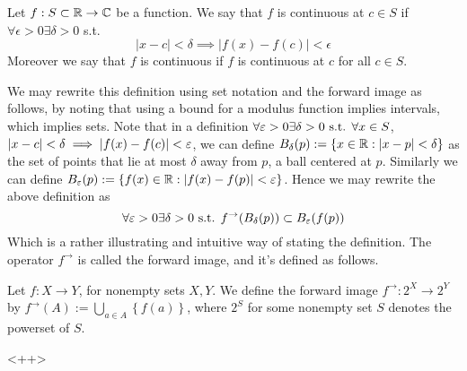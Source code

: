 \begin{definition}
  Let $f:S\subset\mathbb R\to\mathbb C$ be a function. We say that $f$ is continuous at $c\in S$ if
  $\forall\epsilon >0\exists \delta>0$ s.t.
  \[|x-c|<\delta \implies |f(x)-f(c)|<\epsilon\]
  Moreover we say that $f$ is continuous if $f$ is continuous at $c$ for all $c\in S$.
  \label{continuity}
\end{definition}
We may rewrite this definition using set notation and the forward image as follows, by
noting that using a bound for a modulus function implies intervals, which implies sets.
Note that in a definition $\forall \varepsilon>0 \exists \delta>0 \textrm{ s.t. } \forall x\in S$,
$|x-c|<\delta \implies |f(x)-f(c)|<\varepsilon$, we can define $B_{\delta}(p):=\left\{ x\in\mathbb R :
|x-p|<\delta \right\}$ as the set of points that lie at most $\delta$ away from $p$, a
ball centered at $p$. Similarly we can define $B_{\varepsilon}(p):=\left\{ f(x)\in\mathbb R :
|f(x)-f(p)|<\varepsilon \right\}$. Hence we may rewrite the above definition as
\[\forall\varepsilon>0\exists\delta>0 \textrm{ s.t. } f^{\to}(B_{\delta}(p))\subset B_{\varepsilon}(f(p))\]
Which is a rather illustrating and intuitive way of stating the definition. The operator
$f^{\to}$ is called the forward image, and it's defined as follows. 
\begin{definition}
  Let $f:X\to Y$, for nonempty sets $X,Y$. We define the forward image $f^{\to}:2^{X}\to
  2^{Y}$ by $f^{\to}(A):=\bigcup_{a\in A} \left\{ f(a) \right\}$, where $2^S$ for some
  nonempty set $S$ denotes the powerset of $S$.
  \label{<+label+>}
\end{definition}<++>


